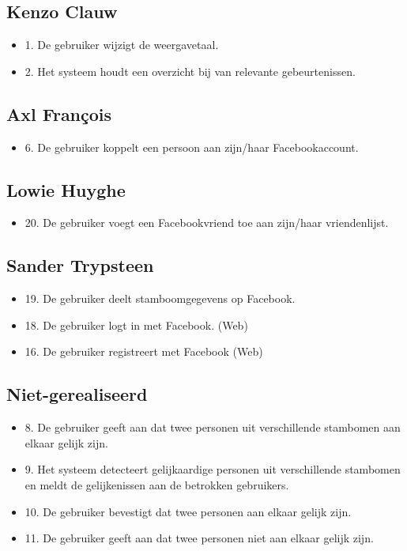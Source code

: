 \documentclass[pdftex,a4paper,12pt,twoside]{report}
\begin{document}
\subsection{Kenzo Clauw}
\begin{itemize}
\item 1. De gebruiker wijzigt de weergavetaal. 
\item 2. Het systeem houdt een overzicht bij van relevante gebeurtenissen. 
\end{itemize}
\subsection{Axl François}
\begin{itemize}
\item 6. De gebruiker koppelt een persoon aan zijn/haar Facebookaccount.
\end{itemize}
\subsection{Lowie Huyghe}
\begin{itemize}
\item 20. De gebruiker voegt een Facebookvriend toe aan zijn/haar vriendenlijst. 
\end{itemize}
\subsection{Sander Trypsteen}
\begin{itemize}
\item 19. De gebruiker deelt stamboomgegevens op Facebook. 
\item 18. De gebruiker logt in met Facebook.  (Web)
\item 16. De gebruiker registreert met Facebook (Web)
\end{itemize}

\subsection{Niet-gerealiseerd}
\begin{itemize}
\item 8. De gebruiker geeft aan dat twee personen uit verschillende stambomen aan elkaar gelijk zijn. 
\item 9. Het systeem detecteert gelijkaardige personen uit verschillende stambomen en meldt de 
gelijkenissen aan de betrokken gebruikers. 
\item 10. De gebruiker bevestigt dat twee personen aan elkaar gelijk zijn. 
\item 11. De gebruiker geeft aan dat twee personen niet aan elkaar gelijk zijn.
\end{itemize}
\end{document}
